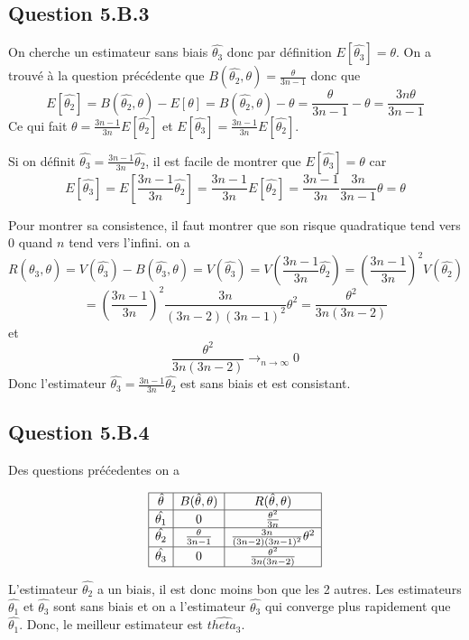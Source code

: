 \documentclass[]{book}
\theoremstyle{definition}
\begin{document}
\subsection*{Question 5.B.3}
On cherche un estimateur sans biais $\hat{\theta_3}$ donc par d\'efinition $E[\hat{\theta_3}] = \theta$. On a trouv\'e \`a la question pr\'ec\'edente que $B(\hat{\theta_2},\theta) = \frac{\theta}{3n-1}$ donc que 
$$
E[\hat{\theta_2}] = B(\hat{\theta_2},\theta) - E[\theta] = B(\hat{\theta_2},\theta) - \theta = \frac{\theta}{3n-1} - \theta = \frac{3n\theta}{3n-1}
$$
Ce qui fait $\theta = \frac{3n-1}{3n}E[\hat{\theta_2}]$ et $E[\hat{\theta_3}] = \frac{3n-1}{3n}E[\hat{\theta_2}]$.

Si on d\'efinit $\hat{\theta_3} = \frac{3n-1}{3n}\hat{\theta_2}$, il est facile de montrer que $E[\hat{\theta_3}] = \theta$ car 
$$
E[\hat{\theta_3}] = E\left[\frac{3n-1}{3n}\hat{\theta_2}\right] = \frac{3n-1}{3n}E[\hat{\theta_2}] = \frac{3n-1}{3n} \frac{3n}{3n-1} \theta = \theta
$$

Pour montrer sa consistence, il faut montrer que son risque quadratique tend vers 0 quand $n$ tend vers l'infini. on a 
$$
R(\hat{\theta_3},\theta) = V(\hat{\theta_3}) - B(\hat{\theta_3},\theta) = V(\hat{\theta_3}) = V\left(\frac{3n-1}{3n}\hat{\theta_2}\right) = \left(\frac{3n-1}{3n}\right)^2V(\hat{\theta_2})
$$
$$
= \left(\frac{3n-1}{3n}\right)^2\frac{3n}{(3n-2)(3n-1)^2}\theta^2 = \frac{\theta^2}{3n(3n-2)}
$$
et
$$
\frac{\theta^2}{3n(3n-2)} \to_{n \to \infty} 0
$$
Donc l'estimateur $\hat{\theta_3} = \frac{3n-1}{3n}\hat{\theta_2}$ est sans biais et est consistant.


\subsection*{Question 5.B.4}
Des questions pr\'e\'cedentes on a 

$$
\begin{array}{|c|c|c|}
    \hline
    \hat{\theta} & B(\hat{\theta},\theta) & R(\hat{\theta},\theta) \\
    \hline
    \hat{\theta_1} & 0 & \frac{\theta^2}{3n} \\
    \hline
    \hat{\theta_2} &  \frac{\theta}{3n-1} & \frac{3n}{(3n-2)(3n-1)^2}\theta^2 \\
    \hline
    \hat{\theta_3} & 0 & \frac{\theta^2}{3n(3n-2)} \\
    \hline
\end{array}
$$

L'estimateur $\hat{\theta_2}$ a un biais, il est donc moins bon que les 2 autres. Les estimateurs $\hat{\theta_1}$ et  $\hat{\theta_3}$ sont sans biais et on a l'estimateur $\hat{\theta_3}$ qui converge plus rapidement que $\hat{\theta_1}$. Donc, le meilleur estimateur est $\hat{theta_3}$.
\end{document}
